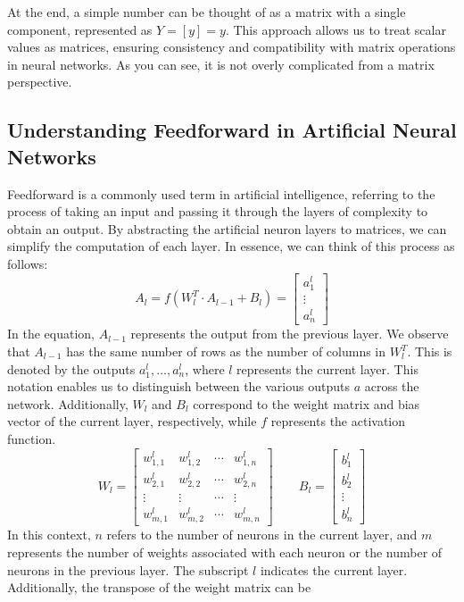 At the end, a simple number can be thought of as a matrix with a single component, represented as $Y = [y] = y$.
This approach allows us to treat scalar values as matrices, ensuring consistency and compatibility with matrix
operations in neural networks. As you can see, it is not overly complicated from a matrix perspective.
\subsection{Understanding Feedforward in Artificial Neural Networks}
Feedforward is a commonly used term in artificial intelligence, referring to the process of taking an input and
passing it through the layers of complexity to obtain an output. By abstracting the artificial neuron layers
to matrices, we can simplify the computation of each layer. In essence, we can think of this process as follows:
\[
A_l = f(W_l^T \cdot A_{l - 1} + B_l) = \begin{bmatrix} a_{1}^l \\ \vdots \\ a_{n}^l \end{bmatrix}
\]
In the equation, $A_{l-1}$ represents the output from the previous layer. We observe that $A_{l-1}$ has the same
number of rows as the number of columns in $W_l^T$. This is denoted by the outputs $a_{1}^l, \ldots, a_{n}^l$,
where $l$ represents the current layer. This notation enables us to distinguish between the various outputs
$a$ across the network. Additionally, $W_l$ and $B_l$ correspond to the weight matrix and bias vector of the
current layer, respectively, while $f$ represents the activation function.
\[
W_l = \begin{bmatrix} w_{1, 1}^l & w_{1, 2}^l & \cdots & w_{1, n}^l \\
  w_{2, 1}^l & w_{2, 2}^l & \cdots & w_{2, n}^l \\
  \vdots & \vdots & \cdots & \vdots \\
  w_{m, 1}^l & w_{m, 2}^l & \cdots & w_{m, n}^l
\end{bmatrix}
\quad\quad B_l = \begin{bmatrix} b_{1}^l \\ b_{2}^l \\ \vdots \\ b_{n}^l \end{bmatrix}
\]
In this context, $n$ refers to the number of neurons in the current layer, and $m$ represents
the number of weights associated with each neuron or the number of neurons in the previous layer.
The subscript $l$ indicates the current layer. Additionally, the transpose of the weight matrix can be
